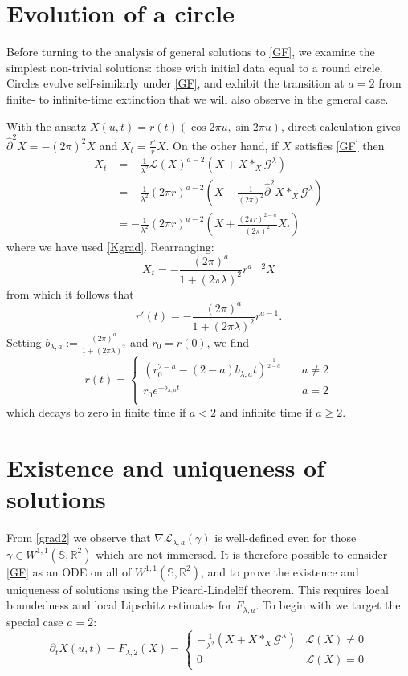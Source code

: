 \documentclass[a4paper,11pt]{amsart}
\theoremstyle{definition}\newtheorem*{definition}{Definition}
\theoremstyle{definition} \newtheorem{proposition}[theorem]{Proposition}
\theoremstyle{definition}\newtheorem{lemma}[theorem]{Lemma}
\theoremstyle{definition}\newtheorem{corollary}[theorem]{Corollary}
\theoremstyle{definition}\newtheorem{example}{Example}
\theoremstyle{remark}\newtheorem*{remark}{Remark}
\def\R{\mathbb{R}}
\def\S{\mathbb{S}}
\def\length{\mathcal L}
\def\wsr{W^{1,1}(\S,\R^2)}
\begin{document}
\section{Evolution of a circle}
\label{sec:circle}

Before turning to the analysis of general solutions to \eqref{GF}, we examine the simplest non-trivial solutions: those with initial data equal to a round circle. 
Circles evolve self-similarly under \eqref{GF}, and exhibit the transition at $a=2$ from finite- to infinite-time extinction that we will also observe in the general case.

With the ansatz $X(u,t)=r(t)(\cos 2\pi u, \sin 2\pi u)$, direct calculation gives $\hat \partial^2 X=-(2\pi)^2 X$ and $X_t=\frac{r'}{r}X$. On the other hand, if $X$ satisfies \eqref{GF} then 
\begin{align*}
 X_t&=-\frac{1}{\lambda^{2}}\length(X)^{a-2}\left(X+X\ast_X\mathcal G^\lambda\right)\\
&=-\frac{1}{\lambda^{2}}(2\pi r)^{a-2}\left (X-\frac{1}{(2\pi)^2}\hat\partial^2 X\ast_X\mathcal G^\lambda \right)\\
&=-\frac{1}{\lambda^{2}}(2\pi r)^{a-2}\left (X+\frac{(2\pi r)^{2-a}}{(2\pi)^2}X_t\right )
\end{align*}
where we have used \eqref{Kgrad}. Rearranging: 
\[ X_t=- \frac{(2\pi)^a}{1+(2\pi\lambda)^2} r^{a-2} X \]
from which it follows that 
\[ r'(t)=- \frac{(2\pi)^a}{1+(2\pi\lambda)^2}r^{a-1}.
\]
Setting $b_{\lambda,a}:=\frac{(2\pi)^a}{1+(2\pi\lambda)^2}$ and $r_0=r(0)$, we find
\[
r(t)=
\begin{cases}
   \left ( r_0^{2-a}-(2-a)b_{\lambda,a}t\right )^{\frac{1}{2-a}} &\quad  a\neq 2\\
   r_0 e^{-b_{\lambda,a}t} & \quad a=2\\
\end{cases}
\]
which decays to zero in finite time if $a<2$ and infinite time if $a\geq 2$.


\section{Existence and uniqueness of solutions}
\label{sec:existence}

From \eqref{grad2} we observe that $\nabla\length_{\lambda,a}(\gamma)$ is well-defined even for those $\gamma\in \wsr$ which are not immersed. 
It is therefore possible to consider \eqref{GF} as an ODE on all of $\wsr$, and to prove the existence and uniqueness of solutions using the Picard-Lindel\"of theorem. 
This requires local boundedness and local Lipschitz estimates for $F_{\lambda,a}$. 
To begin with we target the special case $a=2$:
\begin{equation}\label{GF2}\tag{GF2}
\partial_t X(u,t)=F_{\lambda,2}(X)=
\begin{cases}
-\frac{1}{ \lambda^2} \left (X+X\ast_X\mathcal{G}^\lambda \right ) & \length(X)\neq 0 \\
0 & \length(X)=0
\end{cases}
\end{equation}
\end{document}
